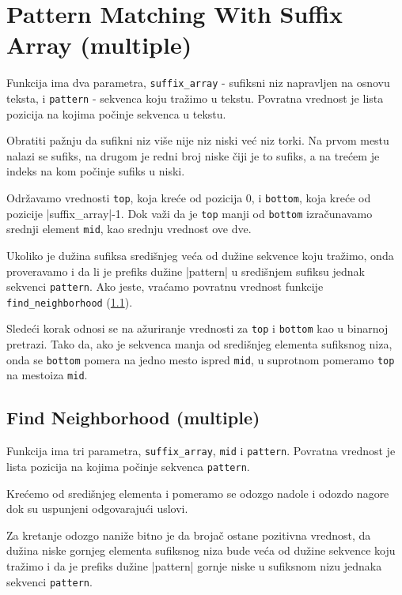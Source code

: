 \section{Pattern Matching With Suffix Array (multiple)}

Funkcija ima dva parametra, \texttt{suffix\_array} - sufiksni niz napravljen na osnovu teksta, i \texttt{pattern} - sekvenca koju tražimo u tekstu. Povratna vrednost je lista pozicija na kojima počinje sekvenca u tekstu.

Obratiti pažnju da sufikni niz više nije niz niski već niz torki. Na prvom mestu nalazi se sufiks, na drugom je redni broj niske čiji je to sufiks, a na trećem je indeks na kom počinje sufiks u niski.

Održavamo vrednosti \texttt{top}, koja kreće od pozicija 0, i \texttt{bottom}, koja kreće od pozicije |suffix\_array|-1. Dok važi da je \texttt{top} manji od \texttt{bottom} izračunavamo srednji element \texttt{mid}, kao srednju vrednost ove dve. 

Ukoliko je dužina sufiksa središnjeg veća od dužine sekvence koju tražimo, onda proveravamo i da li je prefiks dužine |pattern| u središnjem sufiksu jednak sekvenci \texttt{pattern}. Ako jeste, vraćamo povratnu vrednost funkcije \texttt{find\_neighborhood} (\ref{findNeighborhoodM}). 

Sledeći korak odnosi se na ažuriranje vrednosti za \texttt{top} i \texttt{bottom} kao u binarnoj pretrazi. Tako da, ako je sekvenca manja od središnjeg elementa sufiksnog niza, onda se \texttt{bottom} pomera na jedno mesto ispred \texttt{mid}, u suprotnom pomeramo \texttt{top} na mestoiza \texttt{mid}.




\subsection{Find Neighborhood (multiple)}
\label{findNeighborhoodM}


Funkcija ima tri parametra, \texttt{suffix\_array}, \texttt{mid} i \texttt{pattern}. Povratna vrednost je lista pozicija na kojima počinje sekvenca \texttt{pattern}.

Krećemo od središnjeg elementa i pomeramo se odozgo nadole i odozdo nagore dok su uspunjeni odgovarajući uslovi. 

Za kretanje odozgo naniže bitno je da brojač ostane pozitivna vrednost, da dužina niske gornjeg elementa sufiksnog niza bude veća od dužine sekvence koju tražimo i da je prefiks dužine |pattern| gornje niske u sufiksnom nizu jednaka sekvenci \texttt{pattern}. 

